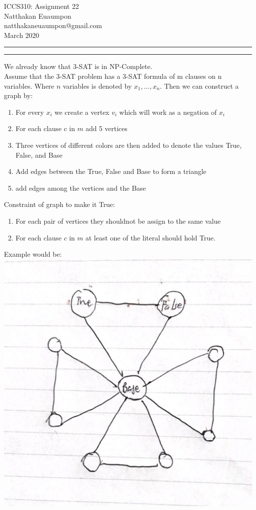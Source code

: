\documentclass[a4paper, 11pt]{article}
\makeatletter
\newcommand{\question}[2] {\vspace{.25in} \hrule\vspace{0.5em}
\noindent{\bf #1: #2} \vspace{0.5em}
\hrule \vspace{.10in}}
\newcommand{\myname}{Natthakan Euaumpon}
\newcommand{\myemail}{natthakaneuaumpon@gmail.com}
\newcommand{\myhwnum}{22}
\makeatother
\begin{document}
\medskip                        %

\thispagestyle{plain}
\begin{center}                  %
{\Large ICCS310: Assignment \myhwnum} \\
\myname \\
\myemail \\
March 2020 \\
\end{center}

\question{1}{Lecture 22}
We already know that 3-SAT is in NP-Complete.\\
Assume that the 3-SAT problem has a 3-SAT formula of m clauses on n variables. Where $n$ variables is denoted by $x_1, ..., x_n$. Then we can construct a graph by:
\begin{enumerate}
	\item For every $x_i$ we create a vertex $v_i$ which will work as a negation of $x_i$
	\item For each clause c in $m$ add 5 vertices
	\item Three vertices of different colors are then added to denote the values True, False, and Base
	\item Add edges between the True, False and Base to form a triangle
	\item add edges among the vertices and the Base
\end{enumerate} 
Constraint of graph to make it True:
\begin{enumerate}
	\item For each pair of vertices they shouldnot be assign to the same value
	\item For each clause $c$ in $m$ at least one of the literal should hold True.
\end{enumerate}
Example would be:\\
\includegraphics[width=\textwidth]{Q22.png}\\
\end{document}
